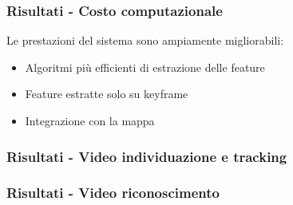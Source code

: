 \documentclass[c]{beamer}
\begin{document}

\begin{frame}
\frametitle{Risultati - Costo computazionale}
Le prestazioni del sistema sono ampiamente migliorabili:
\begin{itemize}
 \item Algoritmi più efficienti di estrazione delle feature
 \item Feature estratte solo su keyframe
 \item Integrazione con la mappa
\end{itemize}
 
\end{frame}


\begin{frame}
\frametitle{Risultati - Video individuazione e tracking}
 
\end{frame}


\begin{frame}
\frametitle{Risultati - Video riconoscimento}
\begin{columns}[c, onlytextwidth]
\end{columns}

\end{frame}

\end{document}
